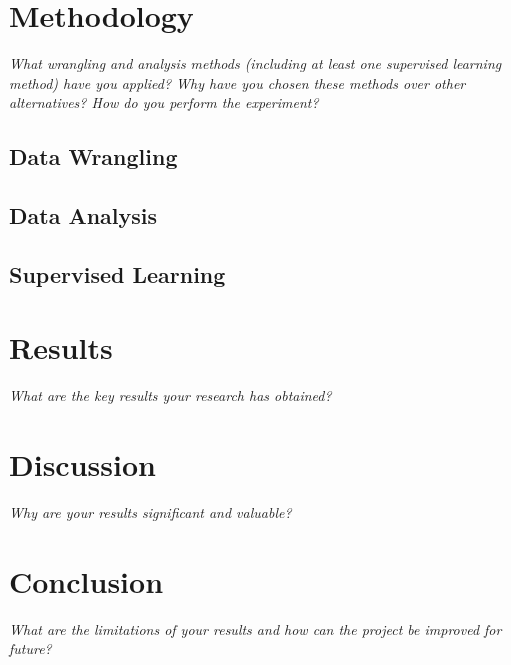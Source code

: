 \documentclass[11pt]{article}
\begin{document}
\section{Methodology}

\emph{What wrangling and analysis methods (including at least one supervised learning method) have you applied? Why have you chosen these methods over other alternatives? How do you perform the experiment?}

\subsection{Data Wrangling}

\subsection{Data Analysis}

\subsection{Supervised Learning}

\section{Results}
\emph{What are the key results your research has obtained?}

\section{Discussion}
\emph{Why are your results significant and valuable?}

\section{Conclusion}
\emph{What are the limitations of your results and how can the project be improved for future?}

\newpage


\end{document}
